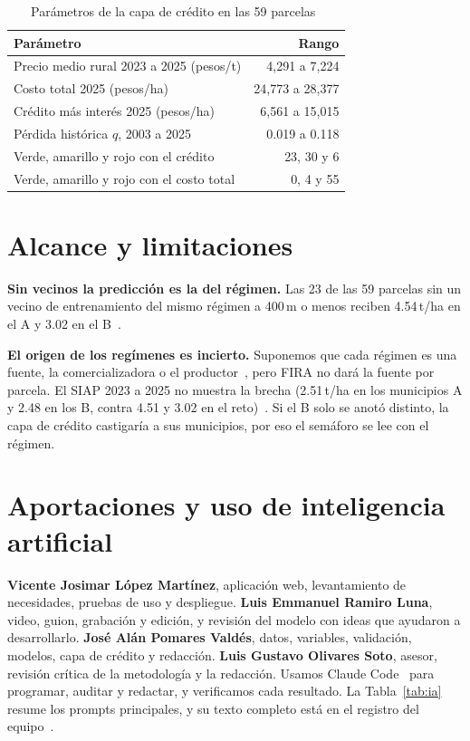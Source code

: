 \documentclass[conference,letterpaper]{IEEEtran}
\begin{document}
\begin{table}[!t]
\centering
\caption{Parámetros de la capa de crédito en las 59 parcelas~\cite{repo}}
\label{tab:credito}
\footnotesize
\begin{tabular}{@{}l@{}r@{}}
\toprule
Parámetro & Rango \\
\midrule
Precio medio rural 2023 a 2025 (pesos/t) & 4,291 a 7,224 \\
Costo total 2025 (pesos/ha) & 24,773 a 28,377 \\
Crédito más interés 2025 (pesos/ha) & 6,561 a 15,015 \\
Pérdida histórica $q$, 2003 a 2025 & 0.019 a 0.118 \\
\midrule
Verde, amarillo y rojo con el crédito & 23, 30 y 6 \\
Verde, amarillo y rojo con el costo total\quad & 0, 4 y 55 \\
\bottomrule
\end{tabular}
\end{table}

\section{Alcance y limitaciones}\label{sec:alcance}

\textbf{Sin vecinos la predicción es la del régimen.} Las 23 de las 59 parcelas sin un vecino de entrenamiento del
mismo régimen a 400\,m o menos reciben 4.54\,t/ha en el A y 3.02 en el B~\cite{doc_modelo}.

\textbf{El origen de los regímenes es incierto.} Suponemos que cada régimen es una fuente, la comercializadora o el
productor~\cite{preguntas,doc_regimenes}, pero FIRA no dará la fuente por parcela. El SIAP 2023 a 2025 no muestra la brecha (2.51\,t/ha en los municipios A y
2.48 en los B, contra 4.51 y 3.02 en el reto)~\cite{doc_regimenes}. Si el B solo se anotó distinto, la capa de crédito castigaría a sus
municipios, por eso el semáforo se lee con el régimen.

\section{Aportaciones y uso de inteligencia artificial}

\textbf{Vicente Josimar López Martínez}, aplicación web, levantamiento de necesidades, pruebas de uso y despliegue.
\textbf{Luis Emmanuel Ramiro Luna}, video, guion, grabación y edición, y revisión del modelo con ideas que ayudaron a
desarrollarlo. \textbf{José Alán Pomares Valdés}, datos, variables, validación, modelos, capa
de crédito y redacción. \textbf{Luis Gustavo Olivares Soto}, asesor, revisión crítica de la metodología y
la redacción. Usamos Claude Code~\cite{claudecode} para programar, auditar y redactar, y verificamos
cada resultado. La Tabla~\ref{tab:ia} resume los prompts principales, y su texto completo está en el registro del
equipo~\cite{prompts}.
\end{document}
